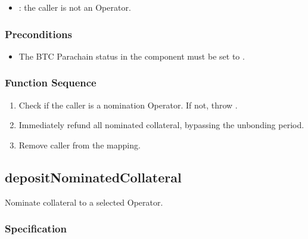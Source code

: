 \documentclass[a4paper,10pt,english]{sphinxmanual}
\begin{document}
\begin{itemize}
\item {} 
: the caller is not an Operator.

\end{itemize}


\subsubsection{Preconditions}
\label{\detokenize{spec/nomination:id11}}\begin{itemize}
\item {} 
The BTC Parachain status in the {\hyperref[\detokenize{spec/security:security}]{}} component must be set to .

\end{itemize}


\subsubsection{Function Sequence}
\label{\detokenize{spec/nomination:id12}}\begin{enumerate}
%
\item {} 
Check if the caller is a nomination Operator. If not, throw .

\item {} 
Immediately refund all nominated collateral, bypassing the unbonding period.

\item {} 
Remove caller from the  mapping.

\end{enumerate}


\subsection{depositNominatedCollateral}
\label{\detokenize{spec/nomination:depositnominatedcollateral}}\label{\detokenize{spec/nomination:id13}}
Nominate collateral to a selected Operator.


\subsubsection{Specification}
\label{\detokenize{spec/nomination:id14}}
\end{document}

